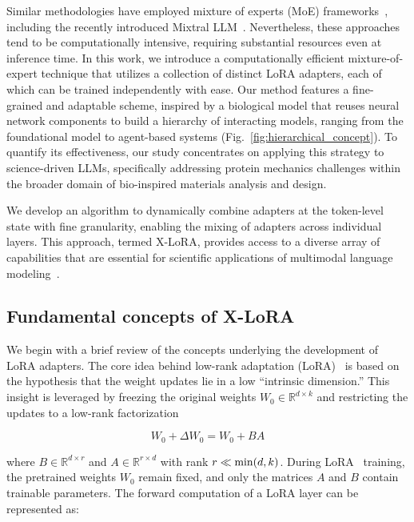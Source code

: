 Similar methodologies have employed mixture of experts (MoE) frameworks~\cite{Jacobs1991AdaptiveExperts,Hampshire1992TheRecognition,Jordan1994HierarchicalAlgorithm}, including the recently introduced Mixtral LLM~\cite{Jiang2024MixtralExperts}. Nevertheless, these approaches tend to be computationally intensive, requiring substantial resources even at inference time. In this work, we introduce a computationally efficient mixture-of-expert technique that utilizes a collection of distinct LoRA adapters, each of which can be trained independently with ease. Our method features a fine-grained and adaptable scheme, inspired by a biological model that reuses neural network components to build a hierarchy of interacting models, ranging from the foundational model to agent-based systems (Fig.~\ref{fig:hierarchical_concept}). To quantify its effectiveness, our study concentrates on applying this strategy to science-driven LLMs, specifically addressing protein mechanics challenges within the broader domain of bio-inspired materials analysis and design.

We develop an algorithm to dynamically combine adapters at the token-level state with fine granularity, enabling the mixing of adapters across individual layers. This approach, termed X-LoRA, provides access to a diverse array of capabilities that are essential for scientific applications of multimodal language modeling~\cite{Hu2023DeepScience,Buehler2023AMetamaterials,Buehler2022ProteinNetworks,}. 

\subsection{Fundamental concepts of X-LoRA}

We begin with a brief review of the concepts underlying the development of LoRA adapters. The core idea behind low-rank adaptation (LoRA)~\cite{hu2021lora} is based on the hypothesis that the weight updates lie in a low “intrinsic dimension.” This insight is leveraged by freezing the original weights $W_0 \in \mathbb{R}^{d \times k}$ and restricting the updates to a low-rank factorization

\begin{equation}
W_0 + \Delta W_0 = W_0 + BA 
\end{equation}

where $B \in \mathbb{R}^{d \times r}$ and $A \in \mathbb{R}^{r \times d}$ with rank $r \ll {\rm min}(d,k)$. During LoRA~\cite{hu2021lora} training, the pretrained weights $W_0$ remain fixed, and only the matrices $A$ and $B$ contain trainable parameters. The forward computation of a LoRA layer can be represented as:


